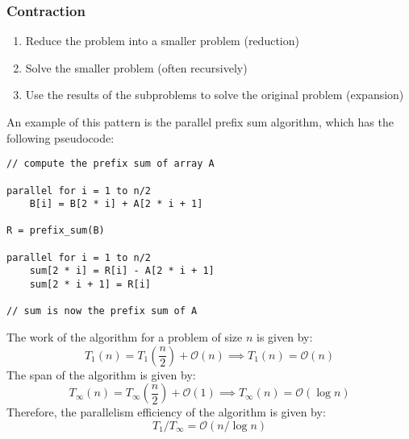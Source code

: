 \documentclass{article}
\begin{document}
\subsubsection{Contraction}
\begin{enumerate}
    \item Reduce the problem into a smaller problem (reduction)
    \item Solve the smaller problem (often recursively)
    \item Use the results of the subproblems to solve the original
          problem (expansion)
\end{enumerate}
An example of this pattern is the parallel prefix sum algorithm, which
has the following pseudocode:
\begin{verbatim}
// compute the prefix sum of array A

parallel for i = 1 to n/2
    B[i] = B[2 * i] + A[2 * i + 1]

R = prefix_sum(B)

parallel for i = 1 to n/2
    sum[2 * i] = R[i] - A[2 * i + 1]
    sum[2 * i + 1] = R[i]

// sum is now the prefix sum of A
\end{verbatim}
The work of the algorithm for a problem of size \(n\) is given by:
\begin{equation*}
    T_1\left( n \right) = T_1\left( \frac{n}{2} \right) + \mathcal{O}\left( n \right) \implies T_1\left( n \right) = \mathcal{O}\left( n \right)
\end{equation*}
The span of the algorithm is given by:
\begin{equation*}
    T_\infty\left( n \right) = T_\infty\left( \frac{n}{2} \right) + \mathcal{O}\left( 1 \right) \implies T_\infty\left( n \right) = \mathcal{O}\left( \log n \right)
\end{equation*}
Therefore, the parallelism efficiency of the algorithm is given by:
\begin{equation*}
    T_1 / T_\infty = \mathcal{O}\left( n / \log n \right)
\end{equation*}
\end{document}
